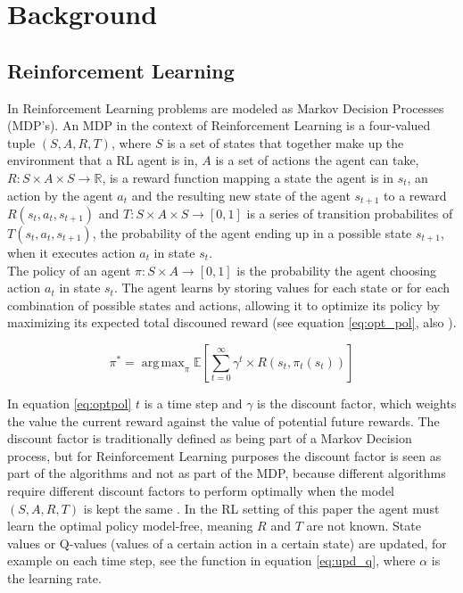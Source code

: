 
\section{Background}

\subsection{Reinforcement Learning}

In Reinforcement Learning problems are modeled as Markov Decision Processes (MDP's). An MDP in the context of Reinforcement Learning
is a four-valued tuple $(S,A,R,T)$, where $S$ is a set of states that together make up the environment that a RL agent is in,
 $A$ is a set of actions the agent can take, $R: S \times A \times S \rightarrow \mathbb{R}$, is a reward function mapping a state the agent is in $s_t$,
 an action by the agent $a_t$ and the resulting new state of the agent $s_{t+1}$ to a reward $R(s_t,a_t,s_{t+1})$
 and $T: S \times A \times S \rightarrow [0,1]$ is a series of transition probabilites of $T(s_t,a_t,s_{t+1})$, the probability of the agent
 ending up in a possible state $s_{t+1}$, when it executes action $a_t$ in state $s_t$. \\
 The policy of an agent $\pi: S \times A \rightarrow [0,1]$ is the probability the agent choosing action $a_t$ in state $s_t$. The agent learns by storing values for each
 state or for each combination of possible states and actions, allowing it to optimize its policy by maximizing its expected total discouned reward
 (see equation \ref{eq:opt_pol}, also \cite{zimmer2016neural}).

\begin{equation}
\label{eq:opt_pol}
\pi^* = \operatorname{arg\,max}_{\pi} \mathbb{E}\left [ \sum_{t = 0}^{\infty}\gamma^{t} \times R(s_t,\pi_t(s_t))\right ]
\end{equation}

In equation \eqref{eq:optpol} $t$ is a time step and $\gamma$ is the discount factor, which weights the value the current reward against the value of potential future rewards.
The discount factor is traditionally defined as being part of a Markov Decision process, but for Reinforcement Learning purposes the discount factor is seen as part
of the algorithms and not as part of the MDP, because different algorithms require different discount factors to perform optimally when the model
$(S,A,R,T)$ is kept the same \cite{van2007reinforcement}. In the RL setting of this paper the agent must learn the optimal policy model-free, meaning $R$ and $T$ are not known.
State values or Q-values (values of a certain action in a certain state) are updated, for example on each time step, see the function in equation \ref{eq:upd_q}, where $\alpha$ is the learning rate.

